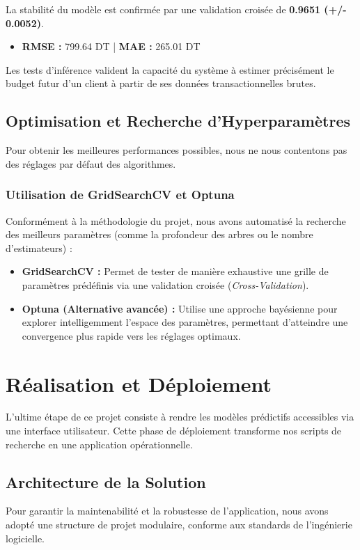 \documentclass[11pt,a4paper]{article}
\begin{document}
\begin{tcolorbox}[colback=green!5,colframe=green!40!black,title=Résultats de l'Entraînement]
La stabilité du modèle est confirmée par une validation croisée de \textbf{0.9651 (+/- 0.0052)}. 
\begin{itemize}
    \item \textbf{RMSE :} 799.64 DT | \textbf{MAE :} 265.01 DT
\end{itemize}
Les tests d'inférence valident la capacité du système à estimer précisément le budget futur d'un client à partir de ses données transactionnelles brutes.
\end{tcolorbox}
\subsection{Optimisation et Recherche d'Hyperparamètres}
Pour obtenir les meilleures performances possibles, nous ne nous contentons pas des réglages par défaut des algorithmes.

\subsubsection{Utilisation de GridSearchCV et Optuna}
Conformément à la méthodologie du projet, nous avons automatisé la recherche des meilleurs paramètres (comme la profondeur des arbres ou le nombre d'estimateurs) :
\begin{itemize}
    \item \textbf{GridSearchCV :} Permet de tester de manière exhaustive une grille de paramètres prédéfinis via une validation croisée (\textit{Cross-Validation}).
    \item \textbf{Optuna (Alternative avancée) :} Utilise une approche bayésienne pour explorer intelligemment l'espace des paramètres, permettant d'atteindre une convergence plus rapide vers les réglages optimaux.
\end{itemize}



\section{Réalisation et Déploiement}

L'ultime étape de ce projet consiste à rendre les modèles prédictifs accessibles via une interface utilisateur. Cette phase de déploiement transforme nos scripts de recherche en une application opérationnelle.

\subsection{Architecture de la Solution}
Pour garantir la maintenabilité et la robustesse de l'application, nous avons adopté une structure de projet modulaire, conforme aux standards de l'ingénierie logicielle.
\end{document}
